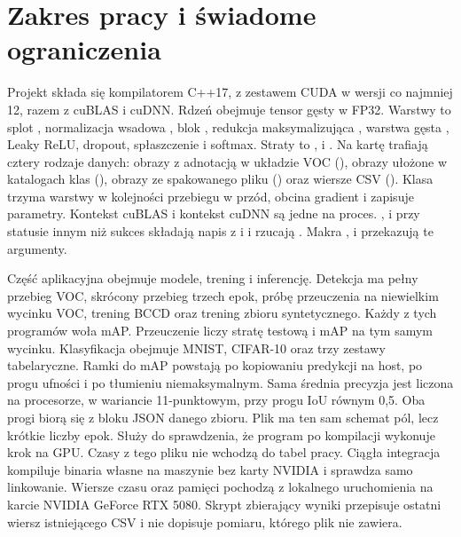 \section{Zakres pracy i świadome ograniczenia}

Projekt składa się kompilatorem C++17, z zestawem CUDA w wersji co najmniej 12, razem z cuBLAS i cuDNN. Rdzeń obejmuje tensor gęsty w FP32. Warstwy to splot , normalizacja wsadowa , blok , redukcja maksymalizująca , warstwa gęsta , Leaky ReLU, dropout, spłaszczenie i softmax. Straty to ,  i . Na kartę trafiają cztery rodzaje danych: obrazy z adnotacją w układzie VOC (), obrazy ułożone w katalogach klas (), obrazy ze spakowanego pliku () oraz wiersze CSV (). Klasa  trzyma warstwy w kolejności przebiegu w przód, obcina gradient i zapisuje parametry. Kontekst cuBLAS i kontekst cuDNN są jedne na proces. ,  i  przy statusie innym niż sukces składają napis z  i  i rzucają . Makra ,  i  przekazują te argumenty.

Część aplikacyjna obejmuje modele, trening i inferencję. Detekcja ma pełny przebieg VOC, skrócony przebieg trzech epok, próbę przeuczenia na niewielkim wycinku VOC, trening BCCD oraz trening zbioru syntetycznego. Każdy z tych programów woła mAP. Przeuczenie liczy stratę testową i mAP na tym samym wycinku. Klasyfikacja obejmuje MNIST, CIFAR-10 oraz trzy zestawy tabelaryczne. Ramki do mAP powstają po kopiowaniu predykcji na host, po progu ufności i po tłumieniu niemaksymalnym. Sama średnia precyzja jest liczona na procesorze, w wariancie 11-punktowym, przy progu IoU równym 0,5. Oba progi biorą się z bloku JSON danego zbioru. Plik  ma ten sam schemat pól, lecz krótkie liczby epok. Służy do sprawdzenia, że program po kompilacji wykonuje krok na GPU. Czasy z tego pliku nie wchodzą do tabel pracy. Ciągła integracja kompiluje binaria własne na maszynie bez karty NVIDIA i sprawdza samo linkowanie. Wiersze czasu oraz pamięci pochodzą z lokalnego uruchomienia na karcie NVIDIA GeForce RTX 5080. Skrypt zbierający wyniki przepisuje ostatni wiersz istniejącego CSV i nie dopisuje pomiaru, którego plik nie zawiera.

